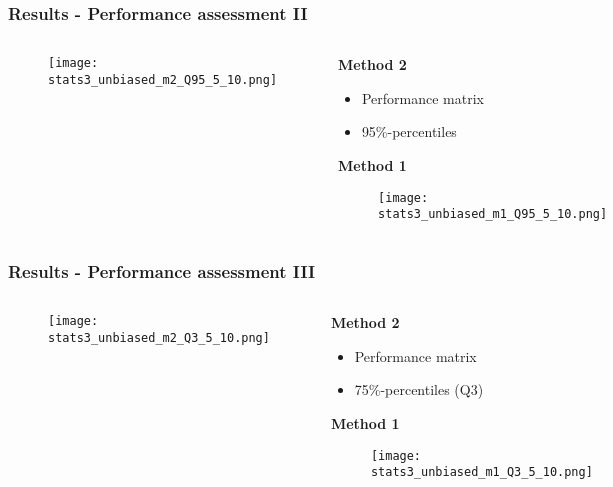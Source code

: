 \documentclass[11pt,aspectratio=169]{beamer}
\begin{document}
	\begin{frame}
		\frametitle{Results - Performance assessment II}
		\begin{columns}[t]
			\begin{RIPcolleft}
				\begin{figure}
					\texttt{[image: stats3\_unbiased\_m2\_Q95\_5\_10.png]}
				\end{figure}
			\end{RIPcolleft}
			\begin{RIPcolright}
				\textbf{Method 2}\\
				\begin{itemize}
					\item Performance matrix
					\item 95\%-percentiles
				\end{itemize}
				\vspace{.5em}
				\textbf{Method 1}\\
				\begin{figure}
					\texttt{[image: stats3\_unbiased\_m1\_Q95\_5\_10.png]}
				\end{figure}
			\end{RIPcolright}
		\end{columns}
	\end{frame}
	\begin{frame}
		\frametitle{Results - Performance assessment III}
		\begin{columns}[t]
			\begin{RIPcolleft}
				\begin{figure}
					\texttt{[image: stats3\_unbiased\_m2\_Q3\_5\_10.png]}
				\end{figure}
			\end{RIPcolleft}
			\begin{RIPcolright}
				\textbf{Method 2}\\
				\begin{itemize}
					\item Performance matrix
					\item 75\%-percentiles (Q3)
				\end{itemize}
				\vspace{.5em}
				\textbf{Method 1}\\
				\begin{figure}
					\texttt{[image: stats3\_unbiased\_m1\_Q3\_5\_10.png]}
				\end{figure}
			\end{RIPcolright}
		\end{columns}
	\end{frame}
\end{document}
